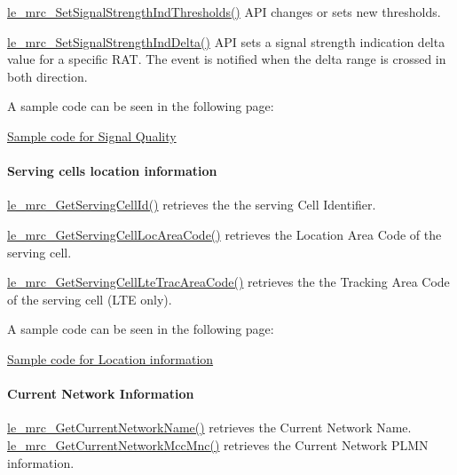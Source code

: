 \hyperlink{le__mrc__interface_8h_aa7883e8c1193c7c8efc87b42cd07c502}{le\+\_\+mrc\+\_\+\+Set\+Signal\+Strength\+Ind\+Thresholds()} A\+PI changes or sets new thresholds.

\hyperlink{le__mrc__interface_8h_a0f2b4015962c83ec9a74ee68f7b509fd}{le\+\_\+mrc\+\_\+\+Set\+Signal\+Strength\+Ind\+Delta()} A\+PI sets a signal strength indication delta value for a specific R\+AT. The event is notified when the delta range is crossed in both direction.

A sample code can be seen in the following page\+:
\begin{DoxyItemize}
\item \hyperlink{c_mrcQuality}{Sample code for Signal Quality}
\end{DoxyItemize}\hypertarget{c_mrc_le_mrc_location}{}\paragraph{Serving cell\textquotesingle{}s location information}\label{c_mrc_le_mrc_location}
\hyperlink{le__mrc__interface_8h_aafc9fb71c3013b7b26dc386b13ca4a85}{le\+\_\+mrc\+\_\+\+Get\+Serving\+Cell\+Id()} retrieves the the serving Cell Identifier.

\hyperlink{le__mrc__interface_8h_a8ba03765e7595f85783f6f6a022311f8}{le\+\_\+mrc\+\_\+\+Get\+Serving\+Cell\+Loc\+Area\+Code()} retrieves the Location Area Code of the serving cell.

\hyperlink{le__mrc__interface_8h_a856dc7825b4fa8de095f26020e03f015}{le\+\_\+mrc\+\_\+\+Get\+Serving\+Cell\+Lte\+Trac\+Area\+Code()} retrieves the the Tracking Area Code of the serving cell (L\+TE only).

A sample code can be seen in the following page\+:
\begin{DoxyItemize}
\item \hyperlink{c_mrcLocationinformation}{Sample code for Location information}
\end{DoxyItemize}\hypertarget{c_mrc_le_mrc_network_information}{}\paragraph{Current Network Information}\label{c_mrc_le_mrc_network_information}
\hyperlink{le__mrc__interface_8h_a45fe1941f520c1e4a23b2794dd2a8232}{le\+\_\+mrc\+\_\+\+Get\+Current\+Network\+Name()} retrieves the Current Network Name. \hyperlink{le__mrc__interface_8h_ac1a0c4fad80538c7df63176576e1d9a3}{le\+\_\+mrc\+\_\+\+Get\+Current\+Network\+Mcc\+Mnc()} retrieves the Current Network P\+L\+MN information.

